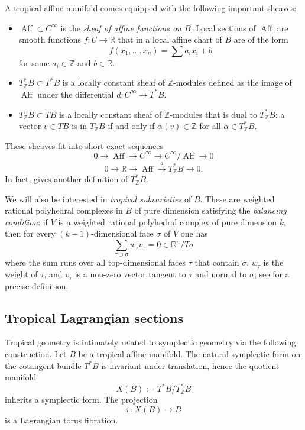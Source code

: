 \documentclass[10pt]{amsart}
\theoremstyle{definition}
\theoremstyle{remark}
\def\R{\mathbb{R}}
\def\Z{\mathbb{Z}}
\DeclareMathOperator{\Aff}{Aff}
\newcommand{\xra}[1]{\xrightarrow{#1}}
\begin{document}
A tropical affine manifold comes equipped with the following important sheaves:
\begin{itemize}
    \item $\Aff \subset C^\infty$ is the \emph{sheaf of affine functions on $B$}. Local sections of $\Aff$ are smooth functions $f:U \to \R$ that in a local affine chart of $B$ are of the form 
    $$
    f(x_1,\dots,x_n) = \sum a_i x_i + b
    $$
    for some $a_i \in \Z$ and $b \in \R$.

    \item $T^*_\Z B \subset T^*B$ is a locally constant sheaf of $\Z$-modules defined as the image of $\Aff$ under the differential $d:C^\infty \to T^*B$.
    
    \item $T_\Z B \subset TB$ is a locally constant sheaf of $\Z$-modules that is dual to $T^*_\Z B$: a vector $v \in TB$ is in $T_\Z B$ if and only if $\alpha(v) \in \Z$ for all $\alpha \in T^*_\Z B$.
\end{itemize}
These sheaves fit into short exact sequences
\begin{equation}\label{eq:sesaffcinfty}
    0 \to \Aff \to C^\infty \to C^\infty / \Aff \to 0
\end{equation}
\begin{equation}\label{eq:sesRAff}
0 \to \R \to \Aff \xra{d} T^*_\Z B \to 0.
\end{equation}
In fact,  gives another definition of $T^*_\Z B$.

We will also be interested in \emph{tropical subvarieties} of $B$.
These are weighted rational polyhedral complexes in $B$ of pure dimension satisfying the \emph{balancing condition}: if $V$ is a weighted rational polyhedral complex of pure dimension $k$, then for every $(k-1)$-dimensional face $\sigma$ of $V$ one has 
$$
\sum_{\tau \supset \sigma} w_\tau v_{\tau} = 0 \in \R^n / T \sigma
$$
where the sum runs over all top-dimensional faces $\tau$ that contain $\sigma$, $w_\tau$ is the weight of $\tau$, and $v_\tau$ is a non-zero vector tangent to $\tau$ and normal to $\sigma$; see \cite{mikhalkin2006tropical} for a precise definition.


\subsection{Tropical Lagrangian sections}\label{sec:tropicallagrangiansections}
Tropical geometry is intimately related to symplectic geometry via the following construction.
Let $B$ be a tropical affine manifold.
The natural symplectic form on the cotangent bundle $T^*B$ is invariant under translation, hence the quotient manifold
$$
X(B) := T^*B / T^*_\Z B
$$
inherits a symplectic form.
The projection 
$$
\pi: X(B) \to B
$$ 
is a Lagrangian torus fibration.
\end{document}
